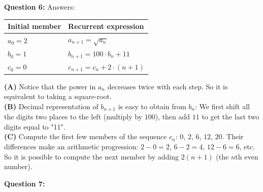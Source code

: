 \documentclass[jou]{apa6}
\begin{document}
\vspace{6pt}
{\bf Question 6:} Answers:\\
\begin{tabular}{|l|l|} \hline
{\bf Initial member} & {\bf Recurrent expression} \\ \hline
$a_0 = 2$ & $a_{n+1} = \sqrt{a_n}$ \\ \hline
$b_0 = 1$ & $b_{n+1} = 100\cdot b_n + 11$ \\ \hline 
$c_0 = 0$ & $c_{n+1} = c_n + 2\cdot(n+1)$ \\ \hline 
\end{tabular}

{\bf (A)} Notice that the power in $a_n$ decreases twice with each step. 
So it is equivalent to taking a square-root.\\
{\bf (B)} Decimal representation of $b_{n+1}$ is easy to obtain from $b_n$: 
We first shift all the digits two places to the left (multiply by $100$), then 
add $11$ to get the last two digits equal to "11".\\
{\bf (C)} Compute the first few members of the sequence $c_n$: 
$0$, $2$, $6$, $12$, $20$. Their differences make an arithmetic progression: 
$2-0 = 2$, $6-2 = 4$, $12-6=6$, etc. So it is possible to compute the next
member by adding $2(n+1)$ (the $n$th even number).



\vspace{6pt}
{\bf Question 7:}

 
\end{document}
